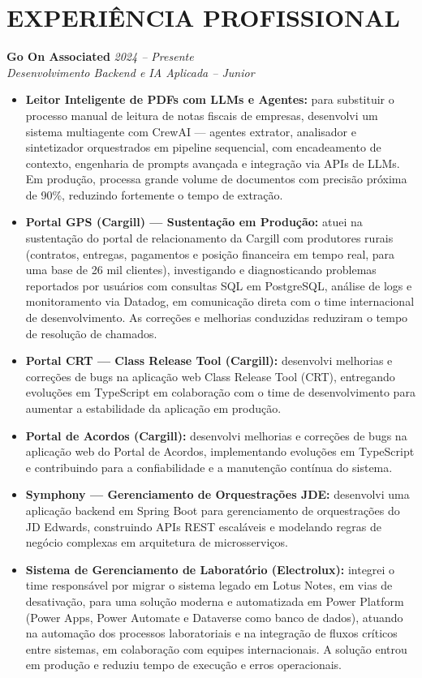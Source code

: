 \documentclass[11pt,a4paper]{article}
\begin{document}
\section{EXPERIÊNCIA PROFISSIONAL}
\noindent
\textbf{Go On Associated} \hfill \textit{2024 -- Presente} \\
\textit{Desenvolvimento Backend e IA Aplicada -- Junior}
\begin{itemize}
    \item \textbf{Leitor Inteligente de PDFs com LLMs e Agentes:} para substituir o processo manual de leitura de notas fiscais de empresas, desenvolvi um sistema multiagente com CrewAI --- agentes extrator, analisador e sintetizador orquestrados em pipeline sequencial, com encadeamento de contexto, engenharia de prompts avançada e integração via APIs de LLMs. Em produção, processa grande volume de documentos com precisão próxima de 90\%, reduzindo fortemente o tempo de extração.
    \item \textbf{Portal GPS (Cargill) --- Sustentação em Produção:} atuei na sustentação do portal de relacionamento da Cargill com produtores rurais (contratos, entregas, pagamentos e posição financeira em tempo real, para uma base de 26 mil clientes), investigando e diagnosticando problemas reportados por usuários com consultas SQL em PostgreSQL, análise de logs e monitoramento via Datadog, em comunicação direta com o time internacional de desenvolvimento. As correções e melhorias conduzidas reduziram o tempo de resolução de chamados.
    \item \textbf{Portal CRT --- Class Release Tool (Cargill):} desenvolvi melhorias e correções de bugs na aplicação web Class Release Tool (CRT), entregando evoluções em TypeScript em colaboração com o time de desenvolvimento para aumentar a estabilidade da aplicação em produção.
    \item \textbf{Portal de Acordos (Cargill):} desenvolvi melhorias e correções de bugs na aplicação web do Portal de Acordos, implementando evoluções em TypeScript e contribuindo para a confiabilidade e a manutenção contínua do sistema.
    \item \textbf{Symphony --- Gerenciamento de Orquestrações JDE:} desenvolvi uma aplicação backend em Spring Boot para gerenciamento de orquestrações do JD Edwards, construindo APIs REST escaláveis e modelando regras de negócio complexas em arquitetura de microsserviços.
    \item \textbf{Sistema de Gerenciamento de Laboratório (Electrolux):} integrei o time responsável por migrar o sistema legado em Lotus Notes, em vias de desativação, para uma solução moderna e automatizada em Power Platform (Power Apps, Power Automate e Dataverse como banco de dados), atuando na automação dos processos laboratoriais e na integração de fluxos críticos entre sistemas, em colaboração com equipes internacionais. A solução entrou em produção e reduziu tempo de execução e erros operacionais.
\end{itemize}
\vspace{8pt}
\end{document}
